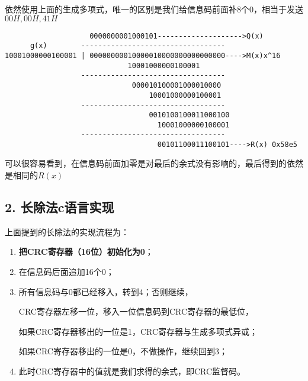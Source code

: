 \documentclass[
]{article}
\begin{document}
依然使用上面的生成多项式，唯一的区别是我们给信息码前面补8个0，相当于发送$00H,00H,41H$

\begin{verbatim}
                    0000000001000101-------------------->Q(x)
      g(x)        ----------------------------------
10001000000100001 | 00000000010000010000000000000000---->M(x)x^16
                             10001000000100001
                  ----------------------------------
                              000010100001000010000
                                  10001000000100001
                  ----------------------------------
                                  0010100100011000100
                                    10001000000100001
                  ----------------------------------
                                    00101100011100101---->R(x) 0x58e5
\end{verbatim}

可以很容易看到，在信息码前面加零是对最后的余式没有影响的，最后得到的依然是相同的$R(x)$

\hypertarget{header-n109}{%
\subsection{2. 长除法c语言实现}\label{header-n109}}

上面提到的长除法的实现流程为：

\begin{enumerate}
\def\labelenumi{\arabic{enumi}.}
\item
  \textbf{把CRC寄存器（16位）初始化为0}；
\item
  在信息码后面追加16个0；
\item
  所有信息码与0都已经移入，转到4；否则继续，

  CRC寄存器左移一位，移入一位信息码到CRC寄存器的最低位，

  如果CRC寄存器移出的一位是1，CRC寄存器与生成多项式异或；

  如果CRC寄存器移出的一位是0，不做操作，继续回到3；
\item
  此时CRC寄存器中的值就是我们求得的余式，即CRC监督码。
\end{enumerate}
\end{document}
